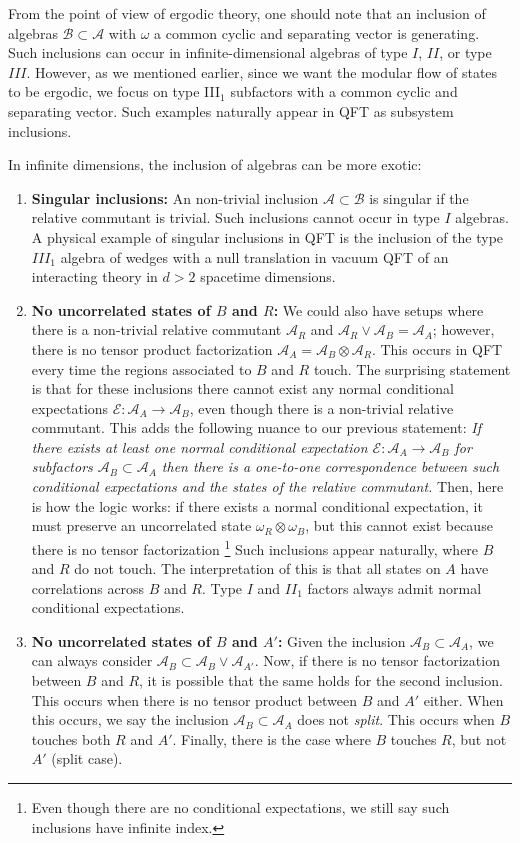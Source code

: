 \documentclass[a4paper,11pt]{article}
\theoremstyle{definition}
\newcommand{\mA}{\mathcal{A}}
\newcommand{\mB}{\mathcal{B}}
\newcommand{\mE}{\mathcal{E}}
\begin{document}
From the point of view of ergodic theory, one should note that an inclusion of algebras $\mB\subset \mA$ with $\omega$ a common cyclic and separating vector is generating. Such inclusions can occur in infinite-dimensional algebras of type $I$, $II$, or type $III$. However, as we mentioned earlier, since we want the modular flow of states to be ergodic, we focus on type III$_1$ subfactors with a common cyclic and separating vector. Such examples naturally appear in QFT as subsystem inclusions.

In infinite dimensions, the inclusion of algebras can be more exotic:
\begin{enumerate}
    \item {\bf Singular inclusions:} An non-trivial inclusion $\mA\subset \mB$ is singular if the relative commutant is trivial. Such inclusions cannot occur in type $I$ algebras. A physical example of singular inclusions in QFT is the inclusion of the type $III_1$ algebra of wedges with a null translation in vacuum QFT of an interacting theory in $d>2$ spacetime dimensions.
    
    \item {\bf No uncorrelated states of $B$ and $R$:} We could also have setups where there is a non-trivial relative commutant $\mA_R$ and $\mA_R\vee \mA_B=\mA_A$; however, there is no tensor product factorization $\mA_A=\mA_B\otimes \mA_R$. This occurs in QFT every time the regions associated to $B$ and $R$ touch. The surprising statement is that for these inclusions there cannot exist any normal conditional expectations $\mE:\mA_A\to \mA_B$, even though there is a non-trivial relative commutant. This adds the following nuance to our previous statement:
    {\it If there exists at least one normal conditional expectation $\mE:\mA_A\to \mA_B$ for subfactors $\mA_B\subset \mA_A$ then there is a one-to-one correspondence between such conditional expectations and the states of the relative commutant.} Then, here is how the logic works: if there exists a normal conditional expectation, it must preserve an uncorrelated state  $\omega_R\otimes \omega_B$, but this cannot exist because there is no tensor factorization \footnote{Even though there are no conditional expectations, we still say such inclusions have infinite index.}
    Such inclusions appear naturally, where $B$ and $R$ do not touch. The interpretation of this is that all states on $A$ have correlations across $B$ and $R$. Type $I$ and $II_1$ factors always admit normal conditional expectations. 

    \item {\bf No uncorrelated states of $B$ and $A'$:} Given the inclusion $\mA_B\subset \mA_A$, we can always consider $\mA_B\subset \mA_B\vee \mA_{A'}$. Now, if there is no tensor factorization between $B$ and $R$, it is possible that the same holds for the second inclusion. This occurs when there is no tensor product between $B$ and $A'$ either. When this occurs, we say the inclusion $\mA_B\subset \mA_A$ does not {\it split}. This occurs when $B$ touches both $R$ and $A'$. Finally, there is the case where $B$ touches $R$, but not $A'$ (split case). 
\end{enumerate}
\end{document}
